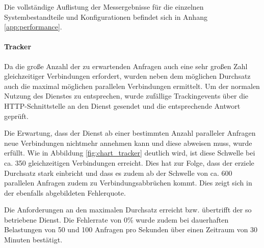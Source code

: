 Die vollständige Auflistung der Messergebnisse für die einzelnen Systembestandteile und Konfigurationen befindet sich in Anhang \ref{app:performance}.

\newpage

\paragraph{Tracker} Da die große Anzahl der zu erwartenden Anfragen auch eine sehr großen Zahl gleichzeitiger Verbindungen erfordert, wurden neben dem möglichen Durchsatz auch die maximal möglichen parallelen Verbindungen ermittelt. Um der normalen Nutzung des Dienstes zu entsprechen, wurde zufällige Trackingevents über die HTTP-Schnittstelle an den Dienst gesendet und die entsprechende Antwort geprüft.

Die Erwartung, dass der Dienst ab einer bestimmten Anzahl paralleler Anfragen neue Verbindungen nichtmehr annehmen kann und diese abweisen muss, wurde erfüllt. Wie in Abbildung \ref{fig:chart_tracker} deutlich wird, ist diese Schwelle bei ca. 350 gleichzeitigen Verbindungen erreicht. Dies hat zur Folge, dass der erziele Durchsatz stark einbricht und dass es zudem ab der Schwelle von ca. 600 parallelen Anfragen zudem zu Verbindungsabbrüchen kommt. Dies zeigt sich in der ebenfalls abgebildeten Fehlerquote.

Die Anforderungen an den maximalen Durchsatz erreicht bzw. übertrifft der so betriebene Dienst. Die Fehlerrate von 0\% wurde zudem bei dauerhaften Belastungen von 50 und 100 Anfragen pro Sekunden über einen Zeitraum von 30 Minuten bestätigt. 

